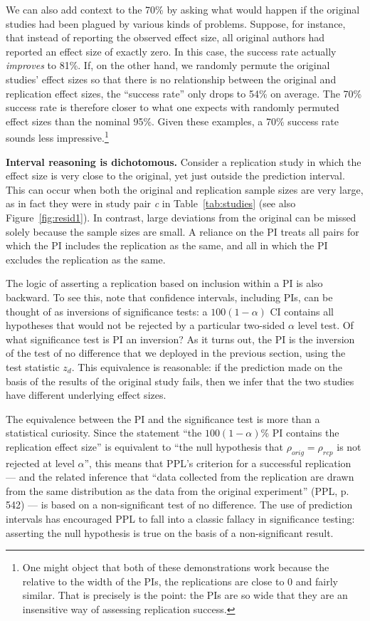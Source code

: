 \documentclass[doc,a4paper,floatsintext,draftfirst]{apa6}
\begin{document}
We can also add context to the 70\% by asking what would happen if the original studies had been plagued by various kinds of problems. Suppose, for instance, that instead of reporting the observed effect size, all original authors had reported an effect size of exactly zero. In this case, the success rate actually {\em improves} to 81\%. If, on the other hand, we randomly permute the original studies' effect sizes so that there is no relationship between the original and replication effect sizes, the ``success rate'' only drops to 54\% on average. The 70\% success rate is therefore closer to what one expects with randomly permuted effect sizes than the nominal 95\%. Given these examples, a 70\% success rate sounds less impressive.\footnote{One might object that both of these demonstrations work because the relative to the width of the PIs, the replications are close to 0 and fairly similar. That is precisely is the point: the PIs are so wide that they are an insensitive way of assessing replication success.}

{\bf Interval reasoning is dichotomous.} Consider a replication study in which the effect size is very close to the original, yet just outside the prediction interval. This can occur when both the original and replication sample sizes are very large, as in fact they were in study pair {\em c} in Table~\ref{tab:studies} (see also Figure~\ref{fig:resid1}). In contrast, large deviations from the original can be missed solely because the sample sizes are small. A reliance on the PI treats all pairs for which the PI includes the replication as the same, and all in which the PI excludes the replication as the same. 

The logic of asserting a replication based on inclusion within a PI is also backward. To see this, note that confidence intervals, including PIs, can be thought of as inversions of significance tests: a $100(1-\alpha)$ CI contains all hypotheses that would not be rejected by a particular two-sided $\alpha$ level test. Of what significance test is PI an inversion? As it turns out, the PI is the inversion of the test of no difference that we deployed in the previous section, using the test statistic $z_d$. This equivalence is reasonable: if the prediction made on the basis of the results of the original study fails, then we infer that the two studies have different underlying effect sizes. 

The equivalence between the PI and the significance test is more than a statistical curiosity. Since the statement ``the $100(1-\alpha)$\% PI contains the replication effect size'' is equivalent to ``the null hypothesis that $\rho_{orig}=\rho_{rep}$ is not rejected at level $\alpha$'', this means that PPL's criterion for a successful replication --- and the related inference that ``data collected from the replication are drawn from the same distribution as the data from the original experiment'' (PPL, p. 542) --- is based on a non-significant test of no difference. The use of prediction intervals has encouraged PPL to fall into a classic fallacy in significance testing: asserting the null hypothesis is true on the basis of a non-significant result.
\end{document}
